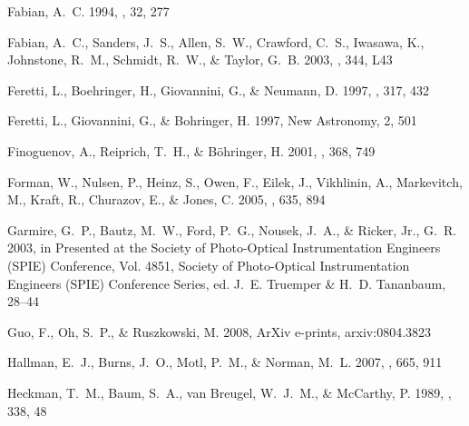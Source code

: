 \documentclass[12pt,preprint]{aastex}
\begin{document}
\begin{thebibliography}{138}
{Fabian}, A.~C. 1994, \araa, 32, 277

{Fabian}, A.~C., {Sanders}, J.~S., {Allen}, S.~W., {Crawford}, C.~S.,
  {Iwasawa}, K., {Johnstone}, R.~M., {Schmidt}, R.~W., \& {Taylor}, G.~B. 2003,
  \mnras, 344, L43

{Feretti}, L., {Boehringer}, H., {Giovannini}, G., \& {Neumann}, D.
  1997{}, \aap, 317, 432

{Feretti}, L., {Giovannini}, G., \& {Bohringer}, H. 1997{}, New
  Astronomy, 2, 501

{Finoguenov}, A., {Reiprich}, T.~H., \& {B{\"o}hringer}, H. 2001, \aap, 368,
  749

{Forman}, W., {Nulsen}, P., {Heinz}, S., {Owen}, F., {Eilek}, J., {Vikhlinin},
  A., {Markevitch}, M., {Kraft}, R., {Churazov}, E., \& {Jones}, C. 2005, \apj,
  635, 894

{Garmire}, G.~P., {Bautz}, M.~W., {Ford}, P.~G., {Nousek}, J.~A., \& {Ricker},
  Jr., G.~R. 2003, in Presented at the Society of Photo-Optical Instrumentation
  Engineers (SPIE) Conference, Vol. 4851, Society of Photo-Optical
  Instrumentation Engineers (SPIE) Conference Series, ed. J.~E. {Truemper} \&
  H.~D. {Tananbaum}, 28--44

{Guo}, F., {Oh}, S.~P., \& {Ruszkowski}, M. 2008, ArXiv e-prints,
  arxiv:0804.3823

{Hallman}, E.~J., {Burns}, J.~O., {Motl}, P.~M., \& {Norman}, M.~L. 2007, \apj,
  665, 911

{Heckman}, T.~M., {Baum}, S.~A., {van Breugel}, W.~J.~M., \& {McCarthy}, P.
  1989, \apj, 338, 48


\end{thebibliography}
\end{document}
